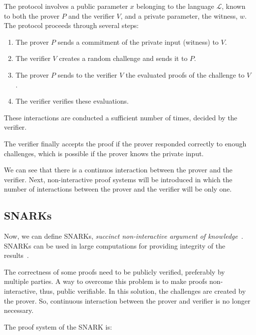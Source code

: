 The protocol involves a public parameter $x$ belonging to the language $\mathcal{L}$, known to both the prover $P$ and the verifier $V$, and a private parameter, the witness, $w$.
The protocol proceeds through several steps:
\begin{enumerate}
    \item The prover $P$ sends a commitment of the private input (witness) to $V$.
    \item The verifier $V$ creates a random challenge and sends it to $P$.
    \item The prover $P$ sends to the verifier $V$ the evaluated proofs of the challenge to $V$.
    \item The verifier verifies these evaluations.
\end{enumerate}

These interactions are conducted a sufficient number of times, decided by the verifier.

The verifier finally accepts the proof if the prover responded correctly to enough challenges, which is possible if the prover knows the private input.

We can see that there is a continuos interaction between the prover and the verifier. Next, non-interactive proof systems will be introduced in which the number of interactions between the prover and the verifier will be only one.

\subsection{SNARKs}
Now, we can define SNARKs, \textit{succinct non-interactive argument of knowledge}~\cite{10.1145/3335741.3335757}. SNARKs can be used in large computations for providing integrity of the results~\cite{nitulescu2020zk}.

The correctness of some proofs need to be publicly verified, preferably by multiple parties. A way to overcome this problem is to make proofs non-interactive, thus, public verifiable. In this solution, the challenges are created by the prover. So, continuous interaction between the prover and verifier is no longer necessary.

The proof system of the SNARK is:

